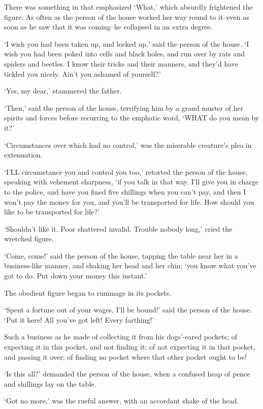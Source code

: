 There was something in that emphasized ‘What,’ which absurdly frightened
the figure. As often as the person of the house worked her way round to
it--even as soon as he saw that it was coming--he collapsed in an extra
degree.

‘I wish you had been taken up, and locked up,’ said the person of the
house. ‘I wish you had been poked into cells and black holes, and run
over by rats and spiders and beetles. I know their tricks and their
manners, and they’d have tickled you nicely. Ain’t you ashamed of
yourself?’

‘Yes, my dear,’ stammered the father.

‘Then,’ said the person of the house, terrifying him by a grand muster
of her spirits and forces before recurring to the emphatic word, ‘WHAT
do you mean by it?’

‘Circumstances over which had no control,’ was the miserable creature’s
plea in extenuation.

‘I’LL circumstance you and control you too,’ retorted the person of the
house, speaking with vehement sharpness, ‘if you talk in that way. I’ll
give you in charge to the police, and have you fined five shillings when
you can’t pay, and then I won’t pay the money for you, and you’ll be
transported for life. How should you like to be transported for life?’

‘Shouldn’t like it. Poor shattered invalid. Trouble nobody long,’ cried
the wretched figure.

‘Come, come!’ said the person of the house, tapping the table near her
in a business-like manner, and shaking her head and her chin; ‘you know
what you’ve got to do. Put down your money this instant.’

The obedient figure began to rummage in its pockets.

‘Spent a fortune out of your wages, I’ll be bound!’ said the person of
the house. ‘Put it here! All you’ve got left! Every farthing!’

Such a business as he made of collecting it from his dogs’-eared
pockets; of expecting it in this pocket, and not finding it; of not
expecting it in that pocket, and passing it over; of finding no pocket
where that other pocket ought to be!

‘Is this all?’ demanded the person of the house, when a confused heap of
pence and shillings lay on the table.

‘Got no more,’ was the rueful answer, with an accordant shake of the
head.

